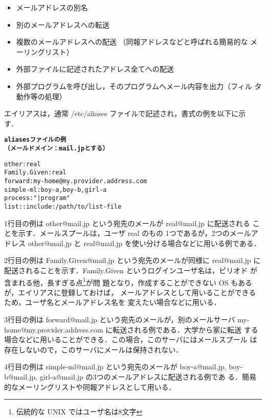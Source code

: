 \begin{itemize}
\item メールアドレスの別名
\item 別のメールアドレスへの転送
\item 複数のメールアドレスへの配送 （同報アドレスなどと呼ばれる簡易的な
      メーリングリスト）
\item 外部ファイルに記述されたアドレス全てへの配送
\item 外部プログラムを呼び出し，そのプログラムへメール内容を出力（フィル
      タ動作等の処理）
\end{itemize}

エイリアスは，通常 /etc/aliases ファイルで記述され，書式の例を以下に示
す．
\begin{center}
\begin{breakbox}
\begin{alltt}

     {\bf  aliases ファイルの例}
     {\bf  （メールドメイン： mail.jp とする）}

other:  real
Family.Given:  real
forward:  my-home@my.provider.address.com
simple-ml:   boy-a, boy-b, girl-a
process:  "|program"
list: :include:/path/to/list-file
\end{alltt}
\end{breakbox}
\end{center}

1行目の例は other@mail.jp という宛先のメールが real@mail.jp に配送される
ことを示す．メールスプールは，ユーザ real のもの 1つであるが，2つのメールア
ドレス other@mail.jp と real@mail.jp を使い分ける場合などに用いる例である．

2行目の例は Family.Given@mail.jp という宛先のメールが同様に real@mail.jp 
に配送されることを示す．Family.Given というログインユーザ名は，ピリオド
が含まれる他，長すぎる点\footnote{伝統的な UNIX ではユーザ名は8文字}が問
題となり，作成することができない OS もあるが，エイリアスに登録しておけば，
メールアドレスとして用いることができるため，ユーザ名とメールアドレス名を
変えたい場合などに用いる．

3行目の例は forward@mail.jp という宛先のメールが，別のメールサーバ
my-home@my.provider.address.com に転送される例である．大学から家に転送
する場合などに用いることができる．この場合，このサーバにはメールスプール
は存在しないので，このサーバにメールは保持されない．

4行目の例は simple-ml@mail.jp という宛先のメールが boy-a@mail.jp,
boy-b@mail.jp, girl-a@mail.jp の3つのメールアドレスに配送される例であ
る．簡易的なメーリングリストや同報アドレスとして用いる．

